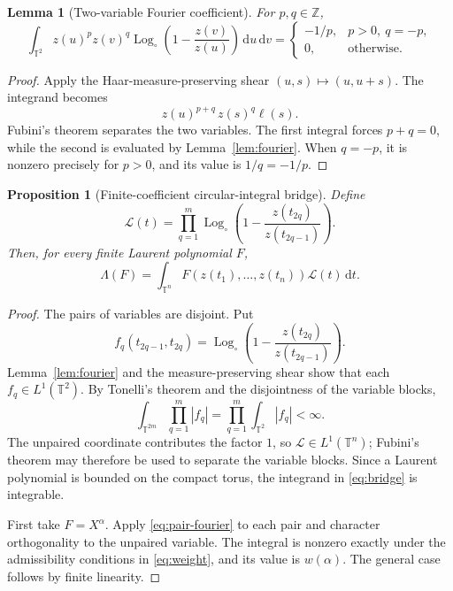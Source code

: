 \documentclass[11pt,a4paper]{article}
\newtheorem{lemma}[theorem]{Lemma}
\newtheorem{proposition}[theorem]{Proposition}
\theoremstyle{definition}
\newcommand{\T}{\mathbb T}
\newcommand{\Z}{\mathbb Z}
\newcommand{\dd}{\,\mathrm d}
\newcommand{\Logc}{\operatorname{Log}_{\circ}}
\begin{document}
\begin{lemma}[Two-variable Fourier coefficient]\label{lem:pair-fourier}
For $p,q\in\Z$,
\begin{equation}\label{eq:pair-fourier}
\int_{\T^2}z(u)^pz(v)^q
\Logc\!\left(1-\frac{z(v)}{z(u)}\right)\dd u\dd v
=
\begin{cases}
-1/p,&p>0,\ q=-p,\\
0,&\text{otherwise}.
\end{cases}
\end{equation}
\end{lemma}

\begin{proof}
Apply the Haar-measure-preserving shear
$(u,s)\mapsto(u,u+s)$. The integrand becomes
\[
 z(u)^{p+q}\,z(s)^q\ell(s).
\]
Fubini's theorem separates the two variables. The first integral forces
$p+q=0$, while the second is evaluated by Lemma~\ref{lem:fourier}.
When $q=-p$, it is nonzero precisely for $p>0$, and its value is
$1/q=-1/p$.
\end{proof}

\begin{proposition}[Finite-coefficient circular-integral bridge]
\label{prop:bridge}
Define
\[
 \mathcal L(t)=\prod_{q=1}^{m}
 \Logc\!\left(1-\frac{z(t_{2q})}{z(t_{2q-1})}\right).
\]
Then, for every finite Laurent polynomial $F$,
\begin{equation}\label{eq:bridge}
 \Lambda(F)=\int_{\T^n}F(z(t_1),\ldots,z(t_n))
 \mathcal L(t)\dd t.
\end{equation}
\end{proposition}

\begin{proof}
The pairs of variables are disjoint. Put
\[
 f_q(t_{2q-1},t_{2q})
 =\Logc\!\left(1-\frac{z(t_{2q})}{z(t_{2q-1})}\right).
\]
Lemma~\ref{lem:fourier} and the measure-preserving shear show that each
$f_q\in L^1(\T^2)$. By Tonelli's theorem and the disjointness of the
variable blocks,
\[
 \int_{\T^{2m}}\prod_{q=1}^m|f_q|
 =\prod_{q=1}^m\int_{\T^2}|f_q|<\infty.
\]
The unpaired coordinate contributes the factor $1$, so
$\mathcal L\in L^1(\T^n)$; Fubini's theorem may therefore be used to
separate the variable blocks. Since a Laurent polynomial is bounded on
the compact torus, the integrand in \eqref{eq:bridge} is integrable.

First take $F=X^\alpha$. Apply \eqref{eq:pair-fourier} to each pair and
character orthogonality to the unpaired variable. The integral is nonzero
exactly under the admissibility conditions in \eqref{eq:weight}, and its
value is $w(\alpha)$. The general case follows by finite linearity.
\end{proof}
\end{document}
